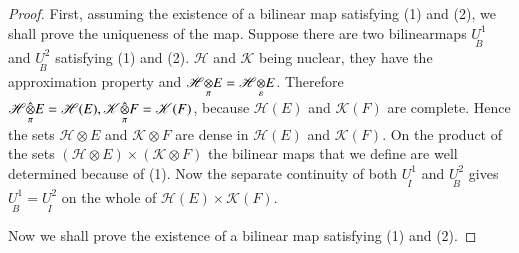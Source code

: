 \begin{proof}
First, assuming the existence of a bilinear map satisfying (1) and
(2), we shall prove the uniqueness of the map. Suppose there are two
bilinear\pageoriginale maps $\underset{B}{U^1}$ and
$\underset{B}{U^2}$ satisfying (1) and (2). $\mathscr{H}$ and
$\mathscr{K}$ being nuclear, they have the approximation property and
$\foprod{\mathscr{H}}{E}{\pi} =\foprod{\mathscr{H}}{E}{\varepsilon}$. 
Therefore $\fohprod{\mathscr{H}}{E}{\pi} =
\mathscr{H}(E),\fohprod{\mathscr{K}}{F}{\pi} = \mathscr{K}(F)$, because
$\mathscr{H}(E)$ and $\mathscr{K}(F)$ are complete. Hence the sets
$\mathscr{H} \otimes E$ and $\mathscr{K}\otimes F$ are dense in
$\mathscr{H}(E)$ and $\mathscr{K}(F)$. On the product of the sets
$(\mathscr{H} \otimes E)\times (\mathscr{K} \otimes F)$ the bilinear maps
that we define are well determined because of (1). Now the separate
continuity of both $\underset{I}{U^1}$ and $\underset{B}{U^2}$ gives
$\underset{B}{U^1} = \underset{I}{U^2}$ on the whole of
$\mathscr{H}(E)\times \mathscr{K}(F)$. 

Now we shall prove the existence of a bilinear map satisfying (1) and
(2).


\end{proof}
